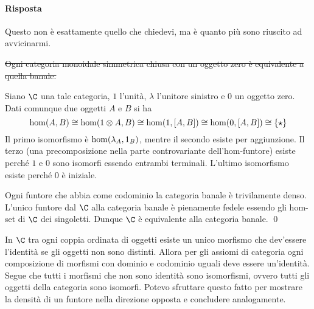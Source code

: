 \paragraph*{Risposta}

Questo non è esattamente quello che chiedevi, ma è quanto più sono riuscito ad avvicinarmi.

\hypertarget{terminal-identity}{}
{\prop \sout{Ogni categoria monoidale simmetrica chiusa con un oggetto zero è equivalente a quella banale.}}
{\proof
Siano $\C$ una tale categoria, $1$ l'unità, $\lambda$ l'unitore sinistro e $0$ un oggetto zero. Dati comunque due oggetti $A$ e $B$ si ha
\[ {\rm hom}(A,B) \cong {\rm hom}(1 \otimes A,B) \cong {\rm hom}(1,\left[A,B\right]) \cong {\rm hom}(0,\left[A,B\right]) \cong  \{\star\} \]
Il primo isomorfismo è ${\rm hom}(\lambda_A,1_B)$, mentre il secondo esiste per aggiunzione. Il terzo (una precomposizione nella parte controvariante dell'hom-funtore) esiste perché $1$ e $0$ sono isomorfi essendo entrambi terminali. L'ultimo isomorfismo esiste perché $0$ è iniziale.

Ogni funtore che abbia come codominio la categoria banale è trivilamente denso. L'unico funtore dal $\C$ alla categoria banale è pienamente fedele essendo gli hom-set di $\C$ dei singoletti. Dunque $\C$ è equivalente alla categoria banale.
\qed}



In $\C$ tra ogni coppia ordinata di oggetti esiste un unico morfismo che dev'essere l'identità se gli oggetti non sono distinti. Allora per gli assiomi di categoria ogni composizione di morfismi con dominio e codominio uguali deve essere un'identità. Segue che tutti i morfismi che non sono identità sono isomorfismi, ovvero tutti gli oggetti della categoria sono isomorfi. Potevo sfruttare questo fatto per mostrare la densità di un funtore nella direzione opposta e concludere analogamente.


